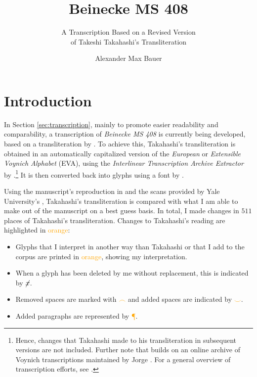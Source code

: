 \documentclass{scrarticle}
\title{Beinecke MS 408}
\subtitle{A Transcription Based on a Revised Version\\of Takeshi Takahashi's Transliteration}
\author{Alexander Max Bauer}
\date{}
\begin{document}
\maketitle

\clearpage
\tableofcontents


\clearpage
\section{Introduction}\label{sec:introduction}
In Section \ref{sec:transcription}, mainly to promote easier readability and comparability, a transcription of \textit{Beinecke MS 408} is currently being developed, based on a transliteration by \citet{takahashi_voynich_2004}.
To achieve this, Takahashi's transliteration is obtained in an automatically capitalized version of the \textit{European} or \textit{Extensible Voynich Alphabet} (EVA), using the \textit{Interlinear Transcription Archive Extractor} by \citet{schwerdtfeger_voynich_2004}.\footnote{Hence, changes that Takahashi made to his transliteration in subsequent versions are not included. Further note that \citet{schwerdtfeger_voynich_2004} builds on an online archive of Voynich transcriptions maintained by Jorge \citet{stolfi_voynich_1998}. For a general overview of transcription efforts, see \citet{zandbergen_text_2023}.}
It is then converted back into glyphs using a font by \citet{bettencourt_voynich_2019}.

Using the manuscript's reproduction in \citet{clemens_voynich_2016} and the scans provided by Yale University's \citet{beinecke_voynich_2004}, Takahashi's transliteration is compared with what I am able to make out of the manuscript on a best guess basis.
In total, I made changes in $511$ places of Takahashi's transliteration.
Changes to Takahashi's reading are highlighted in \textcolor{orange}{orange}:

\begin{itemize}
   \item Glyphs that I interpret in another way than Takahashi or that I add to the corpus are printed in \textcolor{orange}{orange}, showing my interpretation.
   \item When a glyph has been deleted by me without replacement, this is indicated by \textcolor{orange}{$\cancel{x}$}.
   \item Removed spaces are marked with \textcolor{orange}{$\frown$} and added spaces are indicated by \textcolor{orange}{$\smile$}.
   \item Added paragraphs are represented by \textcolor{orange}{{\P}}.
\end{itemize}
\end{document}
